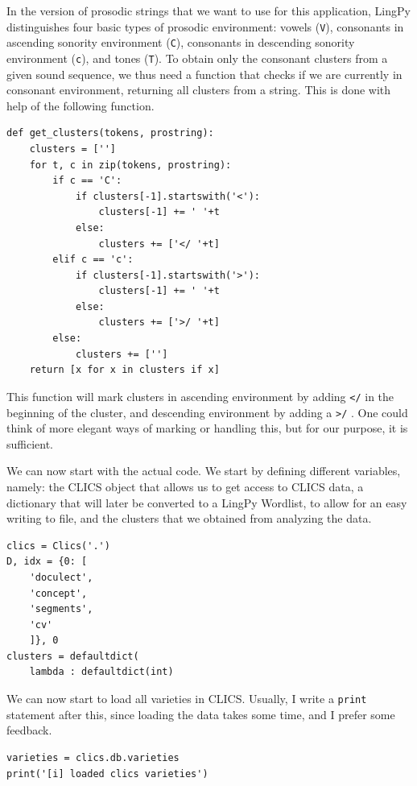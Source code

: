 \documentclass[
  a4paper,
  14pt,
  oneside,
  tablecaptionabove
]{scrbook}
\begin{document}
In the version of prosodic strings that we want to use for this
application, LingPy distinguishes four basic types of prosodic
environment: vowels (\lstinline!V!), consonants in ascending sonority
environment (\lstinline!C!), consonants in descending sonority
environment (\lstinline!c!), and tones (\lstinline!T!). To obtain
only the consonant clusters from a given sound sequence, we thus need a
function that checks if we are currently in consonant environment,
returning all clusters from a string. This is done with help of the
following function.

\begin{lstlisting}
def get_clusters(tokens, prostring):
    clusters = ['']
    for t, c in zip(tokens, prostring):
        if c == 'C':
            if clusters[-1].startswith('<'):
                clusters[-1] += ' '+t
            else:
                clusters += ['</ '+t]
        elif c == 'c':
            if clusters[-1].startswith('>'):
                clusters[-1] += ' '+t
            else:
                clusters += ['>/ '+t]
        else:
            clusters += ['']
    return [x for x in clusters if x]
\end{lstlisting}

This function will mark clusters in ascending environment by adding
\lstinline!</! in the beginning of the cluster, and descending
environment by adding a \lstinline!>/! . One could think of more elegant
ways of marking or handling this, but for our purpose, it is sufficient.

We can now start with the actual code. We start by defining different
variables, namely: the CLICS object that allows us to get access to
CLICS data, a dictionary that will later be converted to a LingPy
Wordlist, to allow for an easy writing to file, and the clusters that we
obtained from analyzing the data.

\begin{lstlisting}
clics = Clics('.') 
D, idx = {0: [ 
    'doculect', 
    'concept', 
    'segments', 
    'cv' 
    ]}, 0 
clusters = defaultdict( 
    lambda : defaultdict(int)
\end{lstlisting}

We can now start to load all varieties in CLICS. Usually, I write a
\lstinline!print! statement after this, since loading the data takes
some time, and I prefer some feedback.

\begin{lstlisting}
varieties = clics.db.varieties
print('[i] loaded clics varieties')
\end{lstlisting}
\end{document}
